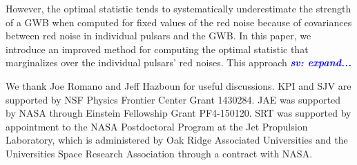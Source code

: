 \documentclass[twocolumn,aps,prd,superscriptaddress]{revtex4-1}
\newcommand{\sv}[1]{\textcolor{blue}{\it{\textbf{sv: #1}}} }
\begin{document}
However, the optimal statistic tends to systematically underestimate the strength of a GWB 
when computed for fixed values of the red noise because of 
covariances between red noise in individual pulsars and the GWB. 
In this paper, we introduce an improved method for computing the optimal statistic 
that marginalizes over the individual pulsars' red noises. 
This approach \sv{expand...}


\acknowledgments
We thank Joe Romano and Jeff Hazboun for useful discussions. 
KPI and SJV are supported by NSF Physics Frontier Center Grant 1430284.
JAE was supported by NASA through Einstein Fellowship Grant PF4-150120. 
SRT was supported by appointment to the NASA Postdoctoral Program 
at the Jet Propulsion Laboratory, which is administered by Oak Ridge Associated Universities 
and the Universities Space Research Association through a contract with NASA. 




\end{document}
